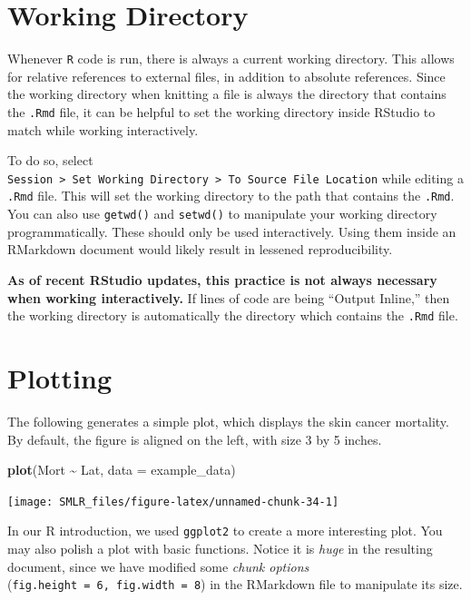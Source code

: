 \documentclass[
]{book}
\newenvironment{Shaded}{\begin{snugshade}}{\end{snugshade}}
\newcommand{\AttributeTok}[1]{\textcolor[rgb]{0.13,0.29,0.53}{#1}}
\newcommand{\FunctionTok}[1]{\textcolor[rgb]{0.13,0.29,0.53}{\textbf{#1}}}
\newcommand{\NormalTok}[1]{#1}
\newcommand{\SpecialCharTok}[1]{\textcolor[rgb]{0.81,0.36,0.00}{\textbf{#1}}}
\theoremstyle{definition}
\theoremstyle{definition}
\theoremstyle{definition}
\theoremstyle{definition}
\theoremstyle{remark}
\begin{document}
\hypertarget{working-directory}{%
\section{Working Directory}\label{working-directory}}

Whenever \texttt{R} code is run, there is always a current working directory. This allows for relative references to external files, in addition to absolute references. Since the working directory when knitting a file is always the directory that contains the \texttt{.Rmd} file, it can be helpful to set the working directory inside RStudio to match while working interactively.

To do so, select \texttt{Session\ \textgreater{}\ Set\ Working\ Directory\ \textgreater{}\ To\ Source\ File\ Location} while editing a \texttt{.Rmd} file. This will set the working directory to the path that contains the \texttt{.Rmd}. You can also use \texttt{getwd()} and \texttt{setwd()} to manipulate your working directory programmatically. These should only be used interactively. Using them inside an RMarkdown document would likely result in lessened reproducibility.

\textbf{As of recent RStudio updates, this practice is not always necessary when working interactively.} If lines of code are being ``Output Inline,'' then the working directory is automatically the directory which contains the \texttt{.Rmd} file.

\hypertarget{plotting}{%
\section{Plotting}\label{plotting}}

The following generates a simple plot, which displays the skin cancer mortality. By default, the figure is aligned on the left, with size 3 by 5 inches.

\begin{Shaded}
\begin{Highlighting}[]
  \FunctionTok{plot}\NormalTok{(Mort }\SpecialCharTok{\textasciitilde{}}\NormalTok{ Lat, }\AttributeTok{data =}\NormalTok{ example\_data)}
\end{Highlighting}
\end{Shaded}

\begin{flushleft}\texttt{[image: SMLR\_files/figure-latex/unnamed-chunk-34-1]} \end{flushleft}

In our R introduction, we used \texttt{ggplot2} to create a more interesting plot. You may also polish a plot with basic functions. Notice it is \emph{huge} in the resulting document, since we have modified some \emph{chunk options} (\texttt{fig.height\ =\ 6,\ fig.width\ =\ 8}) in the RMarkdown file to manipulate its size.
\end{document}
